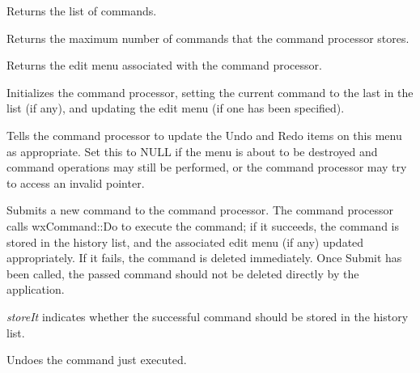 

Returns the list of commands.



Returns the maximum number of commands that the command processor stores.



Returns the edit menu associated with the command processor.



Initializes the command processor, setting the current command to the
last in the list (if any), and updating the edit menu (if one has been
specified).



Tells the command processor to update the Undo and Redo items on this
menu as appropriate. Set this to NULL if the menu is about to be
destroyed and command operations may still be performed, or the command
processor may try to access an invalid pointer.



Submits a new command to the command processor. The command processor
calls wxCommand::Do to execute the command; if it succeeds, the command
is stored in the history list, and the associated edit menu (if any) updated
appropriately. If it fails, the command is deleted
immediately. Once Submit has been called, the passed command should not
be deleted directly by the application.

{\it storeIt} indicates whether the successful command should be stored
in the history list.



Undoes the command just executed.


